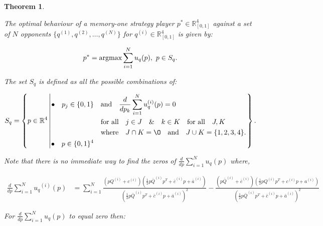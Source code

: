 \documentclass[fleqn,10pt]{wlscirep}
\newcommand{\R}{\mathbb{R}}
\newtheorem{theorem}{Theorem}
\providecommand{\DIFaddbegin}{} %
\providecommand{\DIFaddend}{} %
\begin{document}
\begin{theorem}\label{memone_group_best_response}

    The optimal behaviour of a memory-one strategy player \(p^* \in \R_{[0, 1]} ^
    4\) against a set of \(N\) opponents \(\{q^{(1)}, q^{(2)}, \dots, q^{(N)} \}\)
    for \(q^{(i)} \in \R_{[0, 1]} ^ 4\) is given by:

    \[p^* = \textnormal{argmax}\sum\limits_{i=1} ^ N  u_q(p), \ p \in S_q.\]

    The set \(S_q\) is defined as all the possible combinations of:

    \DIFaddbegin {\scriptsize
    \DIFaddend \begin{equation}\label{eq:s_q_set}
        S_q =
        \left\{p \in \mathbb{R} ^ 4 \left|
            \begin{aligned}
                \bullet\quad p_j \in \{0, 1\} & \quad \text{and} \quad \frac{d}{dp_k}
                \sum\limits_{i=1} ^ N  u_q^{(i)}(p) = 0 \\
                & \quad \text{for all} \quad j \in J \quad \&  \quad k \in K  \quad \text{for all} \quad J, K \\
                & \quad \text{where} \quad J \cap K = \O \quad
                \text{and} \quad J \cup K = \{1, 2, 3, 4\}.\\
                \bullet\quad  p \in \{0, 1\} ^ 4
            \end{aligned}\right.
        \right\}.
    \end{equation}
    \DIFaddbegin }
\DIFaddend 

    Note that there is no immediate way to find the zeros of \(\frac{d}{dp}
    \sum\limits_{i=1} ^ N  u_q(p)\) where,

    \DIFaddbegin {\scriptsize
    \DIFaddend \begin{align}\label{eq:mo_tournament_derivative}
        \frac{d}{dp} \sum\limits_{i=1} ^ {N} {u_q}^{(i)} (p) & = \displaystyle\sum\limits_{i=1} ^ {N}
        \frac{\left(pQ^{(i)} + c^{(i)}\right) \left(\frac{1}{2} p\bar{Q}^{(i)} p^T + \bar{c}^{(i)} p + \bar{a}^ {(i)}\right)}{\left(\frac{1}{2} p\bar{Q}^{(i)} p^T + \bar{c}^{(i)} p + \bar{a}^ {(i)}\right)^ 2}
        - \frac{\left(p\bar{Q}^{(i)} + \bar{c}^{(i)}\right) \left(\frac{1}{2} pQ^{(i)} p^T + c^{(i)} p + a^ {(i)}\right)}{\left(\frac{1}{2} p\bar{Q}^{(i)} p^T + \bar{c}^{(i)} p + \bar{a}^ {(i)}\right)^ 2}
    \end{align}
    \DIFaddbegin }
\DIFaddend 

    For \(\frac{d}{dp} \sum\limits_{i=1} ^ N  u_q(p)\) to equal zero then:


\end{theorem}
\end{document}

